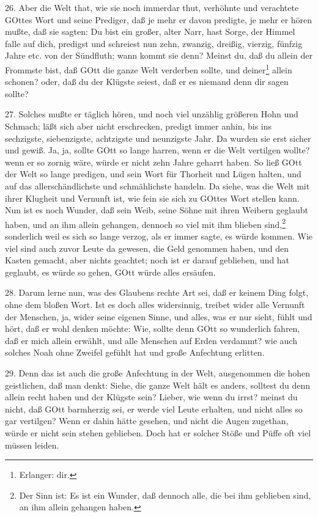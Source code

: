 26. Aber die Welt that, wie sie noch immerdar thut, verhöhnte und verachtete GOttes Wort und seine Prediger, daß je mehr er davon predigte, je mehr er hören mußte, daß sie sagten: Du bist ein großer, alter Narr, hast Sorge, der Himmel falle auf dich, predigst und schreiest nun zehn, zwanzig, dreißig, vierzig, fünfzig Jahre etc. von der Sündfluth; wann kommt sie denn? Meinst du, daß du allein der Frommste bist, daß GOtt die ganze Welt verderben sollte, und deiner\footnote{Erlanger: dir.} allein schonen? oder, daß du der Klügste seiest, daß er es niemand denn dir sagen sollte?

27. Solches mußte er täglich hören, und noch viel unzählig größeren Hohn und Schmach; läßt sich aber nicht erschrecken, predigt immer anhin, bis ins sechzigste, siebenzigste, achtzigste und neunzigste Jahr. Da wurden sie erst sicher und gewiß. Ja, ja, sollte GOtt so lange harren, wenn er die Welt vertilgen wollte? wenn er so zornig wäre, würde er nicht zehn Jahre geharrt haben. So ließ GOtt der Welt so lange predigen, und sein Wort für Thorheit und Lügen halten, und auf das allerschändlichste und schmählichste handeln. Da siehe, was die Welt mit ihrer Klugheit und Vernunft ist, wie fein sie sich zu GOttes Wort stellen kann. Nun ist es noch Wunder, daß sein Weib, seine Söhne mit ihren Weibern geglaubt haben, und an ihm allein gehangen, dennoch so viel mit ihm blieben sind,\footnote{Der Sinn ist: Es ist ein Wunder, daß dennoch alle, die bei ihm geblieben sind, an ihm allein gehangen haben.} sonderlich weil es sich so lange verzog, als er immer sagte, es würde kommen. Wie viel sind auch zuvor Leute da gewesen, die Geld genommen haben, und den Kasten gemacht, aber nichts geachtet; noch ist er darauf geblieben, und hat geglaubt, es würde so gehen, GOtt würde alles ersäufen.

28. Darum lerne nun, was des Glaubens rechte Art sei, daß er keinem Ding folgt, ohne dem bloßen Wort. Ist es doch alles widersinnig, treibet wider alle Vernunft der Menschen, ja, wider seine eigenen Sinne, und alles, was er nur sieht, fühlt und hört, daß er wohl denken möchte: Wie, sollte denn GOtt so wunderlich fahren, daß er mich allein erwählt, und alle Menschen auf Erden verdammt? wie auch solches Noah ohne Zweifel gefühlt hat und große Anfechtung erlitten.

29. Denn das ist auch die große Anfechtung in der Welt, ausgenommen die hohen geistlichen, daß man denkt: Siehe, die ganze Welt hält es anders, solltest du denn allein recht haben und der Klügste sein? Lieber, wie wenn du irrst? meinst du nicht, daß GOtt barmherzig sei, er werde viel Leute erhalten, und nicht alles so gar vertilgen? Wenn er dahin hätte gesehen, und nicht die Augen zugethan, würde er nicht sein stehen geblieben. Doch hat er solcher Stöße und Püffe oft viel müssen leiden.

